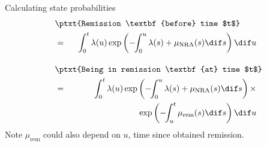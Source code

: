 
\begin{frame}{Calculating state probabilities}
\ \\[-3em]
\begin{eqnarray*}
 \lefteqn{ \ptxt{Remission \textbf{before} time $t$} } \\ & = &
 \int_0^t \lambda(u) \exp\left( -\!\! \int_0^u \lambda(s) + \mu_\text{NRA}(s) \dif s
          \right) \dif u\\[1em]
 \lefteqn{ \ptxt{Being in remission \textbf{at} time $t$} } \\ & = &
 \int_0^t \lambda(u) \exp\left( -\!\! \int_0^u \lambda(s) +
                                               \mu_\text{NRA}(s) \dif s \right)
                     \times \\ & & \hspace*{8em}
                     \exp\left( -\!\! \int_u^t \mu_\text{rem}(s) \dif s \right)
          \dif u
\end{eqnarray*}
Note $\mu_\text{rem}$ could also depend on $u$, time since obtained remission.
\end{frame}

